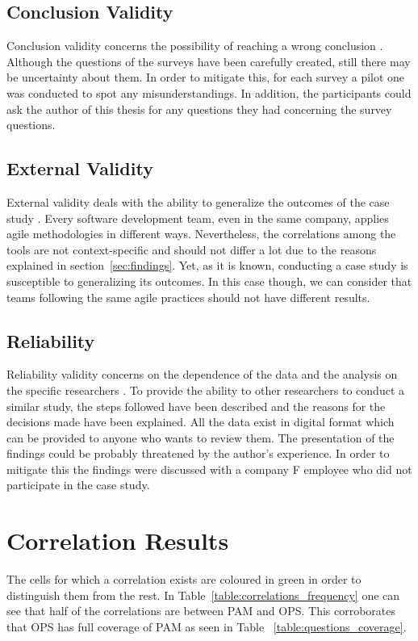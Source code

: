 \subsection{Conclusion Validity}
Conclusion validity concerns the possibility of reaching a wrong conclusion \cite{Wohlin}. Although the questions of the surveys have been carefully created, still there may be uncertainty about them. In order to mitigate this, for each survey a pilot one was conducted to spot any misunderstandings. In addition, the participants could ask the author of this thesis for any questions they had concerning the survey questions.

\subsection{External Validity}
External validity deals with the ability to generalize the outcomes of the case study \cite{Wohlin}. Every software development team, even in the same company, applies agile methodologies in different ways. Nevertheless, the correlations among the tools are not context-specific and should not differ a lot due to the reasons explained in section~\ref{sec:findings}. Yet, as it is known, conducting a case study is susceptible to generalizing its outcomes. In this case though, we can consider that teams following the same agile practices should not have different results.

\subsection{Reliability}
Reliability validity concerns on the dependence of the data and the analysis on the specific researchers \cite{Wohlin}. To provide the ability to other researchers to conduct a similar study, the steps followed have been described and the reasons for the decisions made have been explained. All the data exist in digital format which can be provided to anyone who wants to review them. The presentation of the findings could be probably threatened by the author's experience. In order to mitigate this the findings were discussed with a company F employee who did not participate in the case study.


\section{Correlation Results}
The cells for which a correlation exists are coloured in green in order to distinguish them from the rest. In Table~\ref{table:correlations_frequency} one can see that half of the correlations are between \ac{PAM} and \ac{OPS}. This corroborates that \ac{OPS} has full coverage of \ac{PAM} as seen in Table ~\ref{table:questions_coverage}. %

